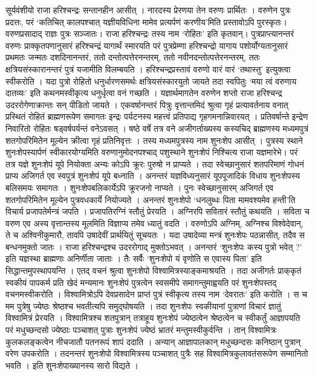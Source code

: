 \documentclass[11pt, a5paper]{article}
\begin{document}
सूर्यवंशीयो राजा हरिश्चन्द्रः सन्तानहीन आसीत् । नारदस्य प्रेरणया तेन वरुणः प्रार्थितः । वरुणेन पुत्रः प्रदत्तः, परं ‘कतिचित् कालपश्चात् यज्ञीयविधिना मामेव प्रत्यर्पणं करणीय’मिति प्रस्तावोऽपि पुरस्कृतः। वरुणप्रसादाद् राज्ञः पुत्रः सञ्जातः। राजा हरिश्चन्द्रः तस्य नाम ‘रोहितः’ इति कृतवान्। पुत्रप्राप्त्यानन्तरं वरुणः प्राक्कृतपणानुसारं हरिश्चन्द्रं यागार्थं स्मारयति परं पुत्रप्रेम्णा हरिश्चन्द्रो यागाय पशोर्योग्यतानुसारं प्रथमतः जन्मतः दशदिनानन्तरं, ततो दन्तोत्पत्तेरनन्तरम्, ततो नवीनदन्तोत्पत्तेरनन्तरम्, ततः क्षत्रियसंस्कारानन्तरं पुत्रं यजामीति विलम्बयति । हरिश्चन्द्रप्रस्तावं वरुणो वारं वारं ‘तथास्तु’ इत्युक्त्वा स्वीकरोति । यदा पुत्रो रोहितो धनुर्धारणसमर्थः क्षत्रियसंस्कारयुतो जायते तदा स्वपितुः ‘मया त्वं वरुणाय दातव्यः’ इति कथनमस्वीकृत्य धनुर्धृत्वा वनं गच्छति । यज्ञार्थमागतेन वरुणेन शप्तो राजा हरिश्चन्द्र उदररोगेणाक्रान्तः सन् पीडितो जायते । एकवर्षानन्तरं पित्रुः वृत्तान्तमिदं श्रुत्वा गृहं प्रत्यावर्तनाय वनात् प्रस्थितं रोहितं ब्राह्मणरूपेण समागतः इन्द्रः पर्यटनस्य महत्त्वं प्रतिपाद्य गृहगमनान्निवारयत् । प्रतिवर्षान्ते इन्द्रेण निवारितो रोहितः षड्‌वर्षपर्यन्तं वनेऽवसत् । षष्ठे वर्षे तत्र वने अजीगर्ताख्यस्य कस्यचिद् ब्राह्मणस्य मध्यमपुत्रं शतगोपरिमितेेन मूल्येन क्रीत्वा गृहं प्रतिनिवृत्तः । तस्य मध्यमपुत्रस्य नाम शुनःशेप आसीत् । पुत्रस्य स्थाने शुनःशेपस्यार्पणं स्वीकारयोग्यमिति वरुणानुमोदनपश्चाद् पशुस्थाने शुनःशेपं निश्चित्य राजा यज्ञमारेभे। परं तत्र यज्ञे शुनःशेपं यूपे नियोक्ता अन्यः कोऽपि क्रूरः पुरुषो न प्राप्यते । तदा स्वेच्छानुसारं शतपरिमाणं गोधनं प्राप्य अजिगर्त एव स्वपुत्रं शुनःशेपं यूपे बध्नाति । अनन्तरं यज्ञविध्यनुसारं यूपपूजादिकं विधाय शुनःशेपस्य बलिसमयः समागतः । शुनःशेपबलिकार्येऽपि क्रूरजनो नाप्यते । पुनः स्वेच्छानुसारम् अजिगर्त एव शतगोपरिमितेन मूल्येन पुत्रवधकार्ये नियोज्यते । अनन्तरं शुनःशेपो ‘धनलुब्धः पिता मामवश्यमेव हन्ती’ति विचार्य प्रजापतेर्मन्त्रं जपति । प्रजापतिरग्निं स्तौतुं प्रेरयति । अग्निरपि सवितारं स्तौतुं कथयति । सविता च वरुण एव अस्य वृत्तान्तस्य मूलमिति विज्ञाप्य तमेव ध्यातुं वदति । वरुणोऽपि अग्निम्, अग्निश्च विश्वेदेवान्, ते च अश्विनीकुमारौ, तावपि उषादेवीं प्रार्थयितुं सूचयतः । यदा उषादेव्या मन्त्रं शुनःशेपः पठन्नासीत्, तदैव स बन्धनमुक्तो जातः । राजा हरिश्चन्द्रश्च उदररोगाद् मुक्तोऽभवत् । अनन्तरं ‘शुनःशेपः कस्य पुत्रो भवेत् ?’ इति यज्ञस्था ब्राह्मणाः अनिर्णीता जाताः । तैः सर्वैः ‘शुनःशेपो यं वृणोति स एवास्य पिता’ इति सिद्धान्तमुपस्थापयन्ति । एतद् वचनं श्रुत्वा शुनःशेपो विश्वामित्रस्याङ्कमाश्रयति । तदा अजीगर्तः प्राक्‌कृतं  स्वकीयं पापकर्म प्रति खेदं मन्यमानः शुनःशेपं पुत्रत्वेन स्वसमीपे समागन्तुमाह्वयति परं शुनःशेपस्तद् वचनमस्वीकरोति । विश्वामित्रोऽपि देवप्रसादेन प्राप्तं पुत्रं स्वीकृत्य तस्य नाम ‘देवरातः’ इति करोति । स च मम पुत्रेषु ज्येष्ठः श्रेष्ठश्च भवतीत्यपि समुद्‌घोषयति । तदा शुनःशेपः स्वकीयानां पुत्राणां विचारं ज्ञातुं विश्वामित्रं प्रेरयति । विश्वामित्रश्च शतपुत्रान् तत्राहूय शुनःशेपं ज्येष्ठत्वेन श्रेष्ठत्वेन च स्वीकर्तुं आज्ञापयति परं मधुच्छन्दसो ज्येष्ठाः पञ्चाशत् पुत्राः शुनःशेपं ज्येष्ठं भ्रातरं मन्तुमस्वीकुर्वन्ति । तान् विश्वामित्रः कुलकलङ्कत्वेन नीचजातौ पतनरूपं शापं ददाति । अन्यान् आज्ञापालकान् मधुच्छन्दसः कनिष्ठान् पुत्रान् वरेण उपकरोति । तदनन्तरं शुनःशेपो विश्वामित्रस्य पञ्चाशत् पुत्रैः सह विश्वामित्रकुलावतंसरूपेण सम्मानितो भवति ।  इति शुनःशेपाख्यानस्य सारो विद्यते ।
\end{document}
